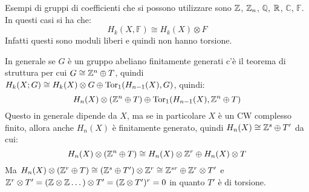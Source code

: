 \begin{osservation}
  Esempi di gruppi di coefficienti che si possono utilizzare sono $ \mathbb{Z} $, $ \mathbb{Z}_n $,
  $ \mathbb{Q} $, $ \mathbb{R}^{} $, $ \mathbb{C} $, $ \mathbb{F} $. In questi casi si ha che:
  \[
    H_k(X, \mathbb{F}) \cong H_k(X) \otimes F
  \]
  Infatti questi sono moduli liberi e quindi non hanno torsione.
\end{osservation}

\begin{osservation}
  In generale se $ G $ è un gruppo abeliano finitamente generati c'è il teorema di struttura
  per cui $ G \cong \mathbb{Z}^n \oplus T $, quindi $ H_k(X;G) \cong H_k(X) \otimes G \oplus \mathrm{Tor_1}( H_{n-1}(X), G) $, quindi:
  \[
    H_n(X) \otimes (\mathbb{Z}^n \oplus T) \oplus \mathrm{Tor_1}( H_{n-1}(X), \mathbb{Z}^n \oplus T)
  \]
  Questo in generale dipende da $ X $, ma se in particolare $ X $ è un CW complesso finito,
  allora anche $ H_n(X) $ è finitamente generato, quindi $ H_n(X) \cong \mathbb{Z}^s \oplus T' $ da cui:
  \[
    H_n(X) \otimes (\mathbb{Z}^n \oplus T) \cong H_n(X) \otimes \mathbb{Z}^r \oplus H_n(X) \otimes T
  \]
  Ma $ H_n(X) \otimes (\mathbb{Z}^r \oplus T) \cong (\mathbb{Z}^s \oplus T') \otimes \mathbb{Z}^r \cong \mathbb{Z}^{sr} \oplus \mathbb{Z}^r \otimes T' $
  e $ \mathbb{Z}^r \otimes T' = (\mathbb{Z} \otimes \mathbb{Z} \dots ) \otimes T' = (\mathbb{Z} \otimes T')^r = 0 $ in quanto $ T' $ è di torsione.


\end{osservation}
